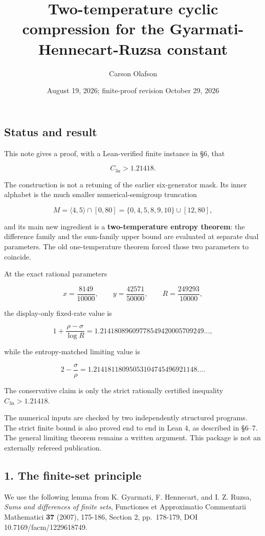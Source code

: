 \documentclass[
  10pt,
]{article}
\title{Two-temperature cyclic compression for the
Gyarmati-Hennecart-Ruzsa constant}
\author{Carson Olafson}
\date{August 19, 2026; finite-proof revision October 29, 2026}
\begin{document}
\maketitle

\subsection{Status and result}\label{status-and-result}

This note gives a proof, with a Lean-verified finite instance in §6,
that

\[
\boxed{C_{3a}>1.21418}.
\]

The construction is not a retuning of the earlier six-generator mask.
Its inner alphabet is the much smaller numerical-semigroup truncation

\[
M=\langle4,5\rangle\cap[0,80]
 =\{0,4,5,8,9,10\}\cup[12,80],
\]

and its main new ingredient is a \textbf{two-temperature entropy
theorem}: the difference family and the sum-family upper bound are
evaluated at separate dual parameters. The old one-temperature theorem
forced those two parameters to coincide.

At the exact rational parameters

\[
x=\frac{8149}{10000},\qquad
 y=\frac{42571}{50000},\qquad
 R=\frac{249293}{10000},
\]

the display-only fixed-rate value is

\[
1+\frac{\rho-\sigma}{\log R}
 =1.21418089609778549420005709249\ldots,
\]

while the entropy-matched limiting value is

\[
2-\frac{\sigma}{\rho}
 =1.21418118095053104745496921148\ldots.
\]

The conservative claim is only the strict rationally certified
inequality \(C_{3a}>1.21418\).

The numerical inputs are checked by two independently structured
programs. The strict finite bound is also proved end to end in Lean 4,
as described in §6--7. The general limiting theorem remains a written
argument. This package is not an externally refereed publication.

\subsection{1. The finite-set principle}\label{the-finite-set-principle}

We use the following lemma from K. Gyarmati, F. Hennecart, and I. Z.
Ruzsa, \emph{Sums and differences of finite sets}, Functiones et
Approximatio Commentarii Mathematici \textbf{37} (2007), 175-186,
Section 2, pp.~178-179, DOI 10.7169/facm/1229618749.
\end{document}
